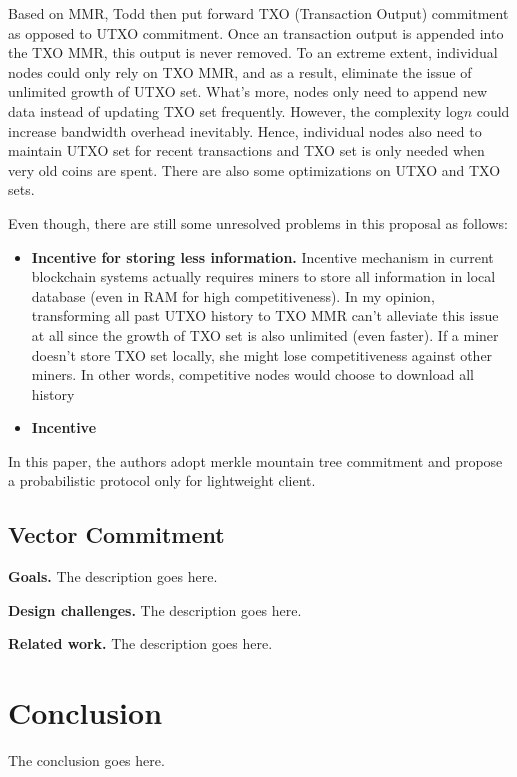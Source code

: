 \documentclass[conference]{IEEEtran}
\begin{document}
Based on MMR, Todd then put forward TXO (Transaction Output) commitment as opposed to UTXO commitment.
%
Once an transaction output is appended into the TXO MMR, this output is never removed.
%
To an extreme extent, individual nodes could only rely on TXO MMR, and as a result, eliminate the issue of unlimited growth of UTXO set.
%
What's more, nodes only need to append new data instead of updating TXO set frequently.
%
However, the complexity log\(n\) could increase bandwidth overhead inevitably.
%
Hence, individual nodes also need to maintain UTXO set for recent transactions and TXO set is only needed when very old coins are spent.
%
There are also some optimizations on UTXO and TXO sets.

Even though, there are still some unresolved problems in this proposal as follows:

\begin{itemize}
  \item \textbf{Incentive for storing less information.} 
        Incentive mechanism in current blockchain systems actually requires miners to store all information in local database (even in RAM for high competitiveness).
        In my opinion, transforming all past UTXO history to TXO MMR can't alleviate this issue at all since the growth of TXO set is also unlimited (even faster).
        If a miner doesn't store TXO set locally, she might lose competitiveness against other miners.
        In other words, competitive nodes would choose to download all history
  \item \textbf{Incentive}
\end{itemize}



%
In this paper\cite{luuflyclient}, the authors adopt merkle mountain tree commitment and propose a probabilistic protocol only for lightweight client.
%


\subsection{Vector Commitment}

\textbf{Goals.} The description goes here.


\textbf{Design challenges.} The description goes here.

\textbf{Related work.} The description goes here.





\section{Conclusion}

The conclusion goes here.




\end{document}
